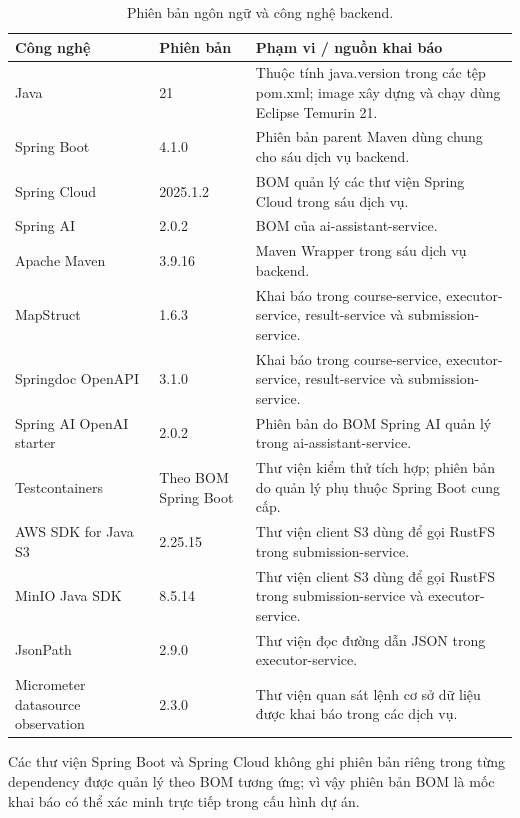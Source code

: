 \documentclass[../BTL.tex]{subfiles}
\begin{document}
\begin{table}[H]
\centering
\small
\begin{tabularx}{\textwidth}{|p{4.0cm}|p{2.0cm}|X|}
\hline
Công nghệ & Phiên bản & Phạm vi / nguồn khai báo \\ \hline
Java & 21 & Thuộc tính \textnormal{java.version} trong các tệp \textnormal{pom.xml}; image xây dựng và chạy dùng Eclipse Temurin 21. \\ \hline
Spring Boot & 4.1.0 & Phiên bản parent Maven dùng chung cho sáu dịch vụ backend. \\ \hline
Spring Cloud & 2025.1.2 & BOM quản lý các thư viện Spring Cloud trong sáu dịch vụ. \\ \hline
Spring AI & 2.0.2 & BOM của \textnormal{ai-assistant-service}. \\ \hline
Apache Maven & 3.9.16 & Maven Wrapper trong sáu dịch vụ backend. \\ \hline
MapStruct & 1.6.3 & Khai báo trong \textnormal{course-service}, \textnormal{executor-service}, \textnormal{result-service} và \textnormal{submission-service}. \\ \hline
Springdoc OpenAPI & 3.1.0 & Khai báo trong \textnormal{course-service}, \textnormal{executor-service}, \textnormal{result-service} và \textnormal{submission-service}. \\ \hline
Spring AI OpenAI starter & 2.0.2 & Phiên bản do BOM Spring AI quản lý trong \textnormal{ai-assistant-service}. \\ \hline
Testcontainers & Theo BOM Spring Boot & Thư viện kiểm thử tích hợp; phiên bản do quản lý phụ thuộc Spring Boot cung cấp. \\ \hline
AWS SDK for Java S3 & 2.25.15 & Thư viện client S3 dùng để gọi RustFS trong \textnormal{submission-service}. \\ \hline
MinIO Java SDK & 8.5.14 & Thư viện client S3 dùng để gọi RustFS trong \textnormal{submission-service} và \textnormal{executor-service}. \\ \hline
JsonPath & 2.9.0 & Thư viện đọc đường dẫn JSON trong \textnormal{executor-service}. \\ \hline
Micrometer datasource observation & 2.3.0 & Thư viện quan sát lệnh cơ sở dữ liệu được khai báo trong các dịch vụ. \\ \hline
\end{tabularx}
\caption{Phiên bản ngôn ngữ và công nghệ backend.}
\label{tab:versions-backend}
\end{table}

Các thư viện Spring Boot và Spring Cloud không ghi phiên bản riêng trong từng dependency được quản lý theo BOM tương ứng; vì vậy phiên bản BOM là mốc khai báo có thể xác minh trực tiếp trong cấu hình dự án.
\end{document}
